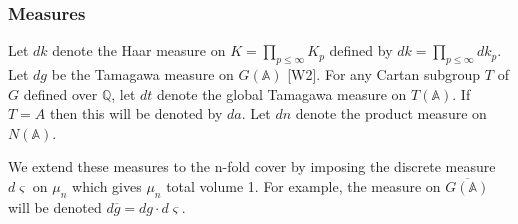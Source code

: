 \documentclass[amsfonts,12pt]{article}
\def\aaa{\mathbb{A}}
\def\qqq{\mathbb{Q}}
\begin{document}
\subsubsection{Measures}

Let $dk$ denote the Haar measure on $K=\prod_{p\leq \infty }K_p$
defined by $dk=\prod_{p\leq \infty }dk_p$.
Let $dg$ be the Tamagawa measure on
$G(\aaa )$ [W2]. For any Cartan subgroup
$T$ of $G$ defined over $\qqq$, let $dt$
denote the global Tamagawa measure on $T(\aaa )$. If $T=A$ then this will
be denoted by $da$. Let $dn$ denote the product measure on $N(\aaa )$.

We extend these measures to the n-fold cover by imposing the discrete
measure $d\varsigma $ on $\mu _n$ which gives $\mu _n$ total volume 1. For
example, the measure on $\overline{G(\aaa )}$ will be denoted
$d\overline{g}=dg\cdot d\varsigma $.










\printindex
\end{document}
